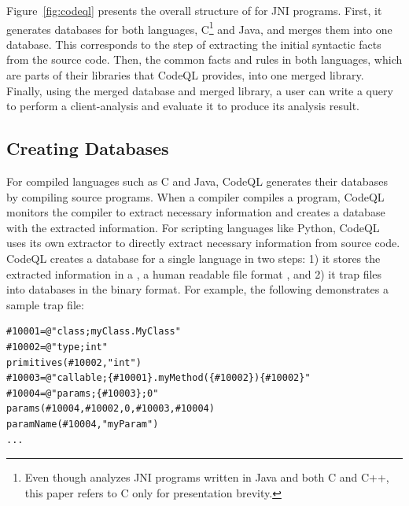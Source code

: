 
Figure~\ref{fig:codeql} presents the overall structure of \ours for JNI
programs.  First, it generates databases for both languages, C\footnote{ Even
though \ours analyzes JNI programs written in Java and both C and C++, this
paper refers to C only for presentation brevity.} and Java, and merges them into
one database.  This corresponds to the step of extracting the initial syntactic
facts from the source code.  Then,  the common facts and rules in both
languages, which are parts of their libraries that CodeQL provides, into one
merged library.  Finally, using the merged database and merged library, a user
can write a query to perform a client-analysis and evaluate it to produce its
analysis result.

\subsection{Creating Databases}
For compiled languages such as C and Java, CodeQL generates their databases by
compiling source programs.  When a compiler compiles a program, CodeQL monitors
the compiler to extract necessary information and creates a database with the
extracted information. For scripting languages like Python, CodeQL uses its own
extractor to directly extract necessary information from source code.
CodeQL creates a database for a single language in two steps:
1) it stores the extracted information in a , a human readable file format , and 2) it  trap files
into databases in the binary format. For example, the
following demonstrates a sample trap file:

\begin{lstlisting}[style=java,numbers=none]
#10001=@"class;myClass.MyClass"
#10002=@"type;int"
primitives(#10002,"int")
#10003=@"callable;{#10001}.myMethod({#10002}){#10002}"
#10004=@"params;{#10003};0"
params(#10004,#10002,0,#10003,#10004)
paramName(#10004,"myParam")
...
\end{lstlisting}

